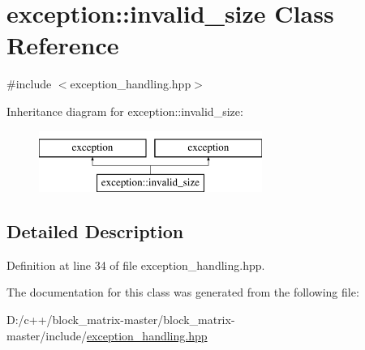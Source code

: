 \hypertarget{classexception_1_1invalid__size}{}\section{exception\+:\+:invalid\+\_\+size Class Reference}
\label{classexception_1_1invalid__size}


{\ttfamily \#include $<$exception\+\_\+handling.\+hpp$>$}

Inheritance diagram for exception\+:\+:invalid\+\_\+size\+:\begin{figure}[H]
\begin{center}
\leavevmode
\includegraphics[height=2.000000cm]{classexception_1_1invalid__size}
\end{center}
\end{figure}


\subsection{Detailed Description}


Definition at line 34 of file exception\+\_\+handling.\+hpp.



The documentation for this class was generated from the following file\+:\begin{DoxyCompactItemize}
\item 
D\+:/c++/block\+\_\+matrix-\/master/block\+\_\+matrix-\/master/include/\mbox{\hyperlink{include_2exception__handling_8hpp}{exception\+\_\+handling.\+hpp}}\end{DoxyCompactItemize}
